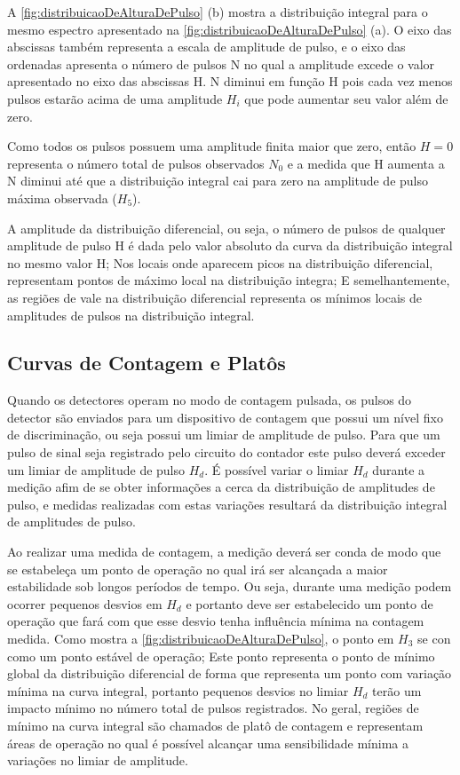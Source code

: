 \documentclass[11pt,a4paper]{article}
\begin{document}
	A  \ref{fig:distribuicaoDeAlturaDePulso} (b) mostra a distribuição integral para o mesmo espectro apresentado na  \ref{fig:distribuicaoDeAlturaDePulso} (a). O eixo das abscissas também representa a escala de amplitude de pulso, e o eixo das ordenadas apresenta o número de pulsos N no qual a amplitude excede o valor apresentado no eixo das abscissas H. N diminui em função H pois cada vez menos pulsos estarão acima de uma amplitude $H_i$ que pode aumentar seu valor além de zero. 
			
	Como todos os pulsos possuem uma amplitude finita maior que zero, então $H = 0$ representa o número total de pulsos observados $N_0$ e a medida que H aumenta a N diminui até que a distribuição integral cai para zero na amplitude de pulso máxima observada ($H_5$). 


	A amplitude da distribuição diferencial, ou seja, o número de pulsos de qualquer amplitude de pulso H é dada pelo valor absoluto da curva da distribuição integral no mesmo valor H; Nos locais onde aparecem picos na distribuição diferencial, representam pontos de máximo local na distribuição integra; E semelhantemente, as regiões de vale na distribuição diferencial representa os mínimos locais de amplitudes de pulsos na distribuição integral. 


\subsection*{Curvas de Contagem e Platôs}

	Quando os detectores operam no modo de contagem pulsada, os pulsos do detector são enviados para um dispositivo de contagem que possui um nível fixo de discriminação, ou seja possui um limiar de amplitude de pulso. Para que um pulso de sinal seja registrado pelo circuito do contador este pulso deverá exceder um limiar de amplitude de pulso $H_d$. É possível variar o limiar $H_d$ durante a medição afim de se obter informações a cerca da distribuição de amplitudes de pulso, e medidas realizadas com estas variações resultará da distribuição integral de amplitudes de pulso. 

	Ao realizar uma medida de contagem, a medição deverá ser conda de modo que se estabeleça um ponto de operação no qual irá ser alcançada a maior estabilidade sob longos períodos de tempo. Ou seja, durante uma medição podem ocorrer pequenos desvios em $H_d$ e portanto deve ser estabelecido um ponto de operação que fará com que esse desvio tenha influência mínima na contagem medida. Como mostra a  \ref{fig:distribuicaoDeAlturaDePulso}, o ponto em $H_3$ se con como um ponto estável de operação; Este ponto representa o ponto de mínimo global da distribuição diferencial de forma que representa um ponto com  variação mínima na curva integral, portanto pequenos desvios no limiar $H_d$ terão um impacto mínimo no número total de pulsos registrados. No geral, regiões de mínimo na curva integral são chamados de platô de contagem e representam áreas de operação no qual é possível alcançar uma sensibilidade mínima a variações no limiar de amplitude. 
\end{document}
